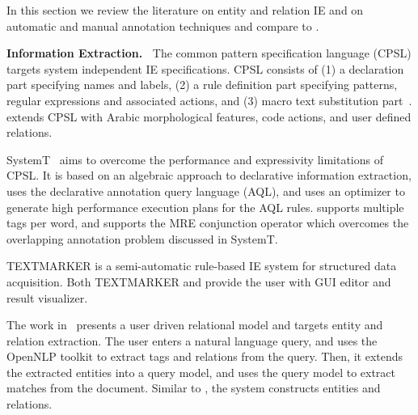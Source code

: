 In this section we review the literature on entity and relation IE 
and on automatic and manual annotation techniques 
and compare to \framework.


{\bf Information Extraction.~}
The common pattern specification language (CPSL) targets system independent IE specifications. 
CPSL consists of 
(1) a declaration part specifying names and labels, 
(2) a rule definition part specifying patterns, regular expressions and associated actions, and 
(3) macro text substitution part~\cite{appelt1998common}.
\framework extends CPSL with Arabic morphological features, code actions, and user defined relations.

SystemT~\cite{chiticariu2010systemt}
aims to overcome the performance and expressivity limitations of CPSL.
It is based on an algebraic approach to declarative information extraction, 
uses the declarative annotation query language (AQL), 
and uses an optimizer to generate high performance execution plans for the AQL rules.
\framework supports multiple tags per word, and supports the MRE conjunction operator which overcomes the overlapping annotation problem discussed in SystemT.

TEXTMARKER is a semi-automatic rule-based IE system 
for structured data acquisition\cite{atzmueller2008rule}.
Both TEXTMARKER and \framework provide the user with GUI editor and result visualizer.

The work in~\cite{urbain2012user} presents a user 
driven relational model and targets entity and relation extraction. 
The user enters a natural language query, and uses the OpenNLP toolkit to 
extract tags and relations from the query. 
Then, it extends the extracted entities into a query model,
and uses the query model to extract matches from the document. 
Similar to \framework, the system constructs entities and relations. 

